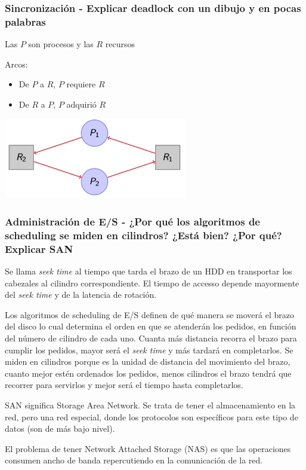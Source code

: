 \subsubsection{Sincronización - Explicar deadlock con un dibujo y en pocas palabras}

Las $P$ son procesos y las $R$ recursos

Arcos:
\begin{itemize}
\item De $P$ a $R$, $P$ requiere $R$
\item De $R$ a $P$, $P$ adquirió $R$
\end{itemize}

\includegraphics[width=0.6\textwidth]{imagenes/deadlock}

\subsubsection{Administración de E/S - ¿Por qué los algoritmos de scheduling se miden en cilindros? ¿Está bien? ¿Por qué? Explicar SAN}
Se llama \textit{seek time} al tiempo que tarda el brazo de un HDD en transportar los cabezales al cilindro correspondiente. El tiempo de accesso depende mayormente del \textit{seek time} y de la latencia de rotación.

Los algoritmos de scheduling de E/S definen de qué manera se moverá el brazo del disco lo cual determina el orden en que se atenderán los pedidos, en función del número de cilindro de cada uno. Cuanta más distancia recorra el brazo para cumplir los pedidos, mayor será el \textit{seek time} y más tardará en completarlos. Se miden en cilindros porque es la unidad de distancia del movimiento del brazo, cuanto mejor estén ordenados los pedidos, menos cilindros el brazo tendrá que recorrer para servirlos y mejor será el tiempo hasta completarlos.

SAN significa Storage Area Network. Se trata de tener el almacenamiento en la red, pero una red especial, donde los protocolos son específicos para este tipo de datos (son de más bajo nivel). 

El problema de tener Network Attached Storage (NAS) es que las operaciones consumen ancho de banda repercutiendo en la comunicación de la red.

